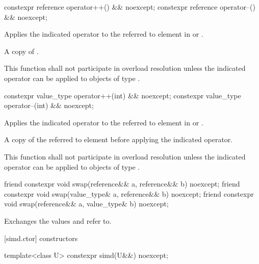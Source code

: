 \begin{itemdecl}
constexpr reference operator++() && noexcept;
constexpr reference operator--() && noexcept;
\end{itemdecl}

\begin{itemdescr}
  \pnum\effects
  Applies the indicated operator to the referred to element in  or .

  \pnum\returns
  A copy of .

  \pnum\remarks
  This function shall not participate in overload resolution unless the indicated operator can be applied to objects of type .
\end{itemdescr}

\begin{itemdecl}
constexpr value_type operator++(int) && noexcept;
constexpr value_type operator--(int) && noexcept;
\end{itemdecl}

\begin{itemdescr}
  \pnum\effects
  Applies the indicated operator to the referred to element in  or .

  \pnum\returns
  A copy of the referred to element before applying the indicated operator.

  \pnum\remarks
  This function shall not participate in overload resolution unless the indicated operator can be applied to objects of type .
\end{itemdescr}

\begin{itemdecl}
friend constexpr void swap(reference&& a, reference&& b) noexcept;
friend constexpr void swap(value_type& a, reference&& b) noexcept;
friend constexpr void swap(reference&& a, value_type& b) noexcept;
\end{itemdecl}

\begin{itemdescr}
  \pnum\effects
  Exchanges the values  and  refer to.
\end{itemdescr}

[simd.ctor]{ constructors}

\begin{itemdecl}
template<class U> constexpr simd(U&&) noexcept;
\end{itemdecl}

